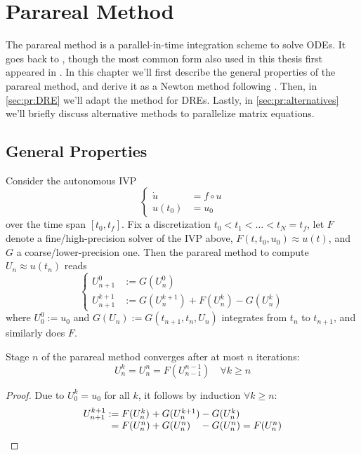 \chapter{Parareal Method}

The parareal method is a parallel-in-time integration scheme to solve \acp{ODE}.
It goes back to \cite{Lions2001},
though the most common form also used in this thesis first appeared in \cite{Baffico2002}.
In this chapter we'll first describe the general properties of the parareal method,
and derive it as a Newton method following \cite{Gander2007}.
Then, in \autoref{sec:pr:DRE} we'll adapt the method for \acp{DRE}.
Lastly, in \autoref{sec:pr:alternatives} we'll briefly discuss alternative methods to parallelize matrix equations.

\section{General Properties}
\label{sec:pr:properties}

Consider the autonomous \ac{IVP}
\begin{equation}
  \label{eq:IVP}
  \left\{
  \begin{aligned}
    \dot u &= f \circ u \\
    u(t_0) &= u_0
  \end{aligned}
  \right.
\end{equation}
over the time span $[t_0, t_f]$.
Fix a discretization $t_0 < t_1 < \ldots < t_N = t_f$,
let $F$ denote a fine/high-precision solver of the \ac{IVP} above,
$F(t, t_0, u_0) \approx u(t)$,
and $G$ a coarse/lower-precision one.
Then the parareal method to compute $U_n \approx u(t_n)$ reads
\begin{equation}
  \label{eq:pr:method}
  \left\{
  \begin{aligned}
    U^0_{n+1} &:= G(U^0_n) \\
    U^{k+1}_{n+1} &:= G(U^{k+1}_n) + F(U^k_n) - G(U^k_n)
  \end{aligned}
  \right.
\end{equation}
where $U^0_0 := u_0$ and $G(U_n) := G(t_{n+1}, t_n, U_n)$
integrates from $t_n$ to $t_{n+1}$,
and similarly does $F$.

\begin{proposition}
\label{thm:pr:conv}
  Stage $n$ of the parareal method converges after at most $n$ iterations:
  \begin{equation*}
    U^k_n = U^n_n = F(U^{n-1}_{n-1})
    \quad
    \forall k \geq n
  \end{equation*}
\end{proposition}
\begin{proof}
  Due to $U^k_0 = u_0$ for all $k$,
  it follows by induction $\forall k \geq n$:
  \begin{equation*}
    \begin{array}{r@{}l@{}l@{}l}
      U^{k+1}_{n+1}
      :={} & F(U^k_n) &{}+ G(U^{k+1}_n) &{}- G(U^k_n) \\
      ={}  & F(U^n_n) &{}+ G(U^n_n)     &{}- G(U^n_n)
      = F(U^n_n)
    \end{array}
  \end{equation*}
\end{proof}

